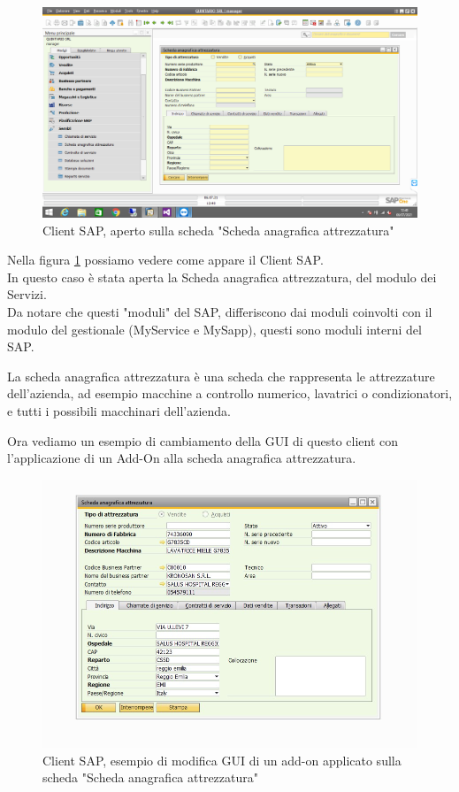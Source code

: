 \begin{figure}[!h] 
	\centering 
	\includegraphics[scale = 0.4]{immagini/client-sap.png} 
	\caption {Client SAP, aperto sulla scheda "Scheda anagrafica attrezzatura"}
	\label{fig:2-4}
\end{figure}

	\item Nella figura \ref{fig:2-4} possiamo vedere come appare il Client SAP.\\In questo caso è stata aperta la Scheda anagrafica attrezzatura, del modulo dei Servizi.\\Da notare che questi "moduli" del SAP, differiscono dai moduli coinvolti con il modulo del gestionale (MyService e MySapp), questi sono moduli interni del SAP.
	\item La scheda anagrafica attrezzatura è una scheda che rappresenta le attrezzature dell'azienda, ad esempio macchine a controllo numerico, lavatrici o condizionatori, e tutti i possibili macchinari dell'azienda.
	\item Ora vediamo un esempio di cambiamento della GUI di questo client con l'applicazione di un Add-On alla scheda anagrafica attrezzatura.

\pagebreak
\begin{figure}[!h] 
	\centering 
	\includegraphics[scale = 0.6]{immagini/esempio-modifica-client-addon.jpg} 
	\caption {Client SAP, esempio di modifica GUI di un add-on applicato sulla scheda "Scheda anagrafica attrezzatura"}
	\label{fig:2-5}
\end{figure}

